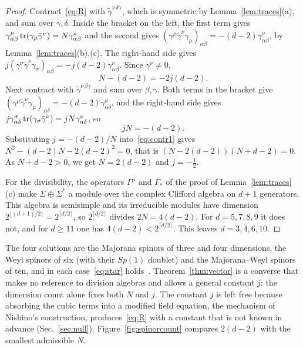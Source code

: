 \begin{proof}
Contract~\eqref{eq:R} with $\tilde\gamma^{\nu\,\delta\gamma}$, which is symmetric by Lemma~\ref{lem:traces}(a), and sum over $\gamma,\delta$. Inside the bracket on the left, the first term gives $\gamma^\mu_{\alpha\beta}\operatorname{tr}(\gamma_\mu\tilde\gamma^\nu)=N\gamma^\nu_{\alpha\beta}$ and the second gives $(\gamma^\mu\tilde\gamma^\nu\gamma_\mu)_{\alpha\beta}=-(d-2)\gamma^\nu_{\alpha\beta}$, by Lemma~\ref{lem:traces}(b),(c). The right-hand side gives $j(\gamma^\sigma\tilde\gamma^\nu\gamma_\sigma)_{\alpha\beta}=-j(d-2)\gamma^\nu_{\alpha\beta}$. Since $\gamma^\nu\ne0$,
\begin{equation}
\label{eq:contr1}
N-(d-2)=-2j(d-2).
\end{equation}
Next contract with $\tilde\gamma^{\nu\,\beta\gamma}$ and sum over $\beta,\gamma$. Both terms in the bracket give $(\gamma^\mu\tilde\gamma^\nu\gamma_\mu)_{\alpha\delta}=-(d-2)\gamma^\nu_{\alpha\delta}$, and the right-hand side gives $j\gamma^\sigma_{\alpha\delta}\operatorname{tr}(\gamma_\sigma\tilde\gamma^\nu)=jN\gamma^\nu_{\alpha\delta}$, so
\begin{equation}
\label{eq:contr2}
jN=-(d-2).
\end{equation}
Substituting $j=-(d-2)/N$ into~\eqref{eq:contr1} gives $N^2-(d-2)N-2(d-2)^2=0$, that is $(N-2(d-2))(N+d-2)=0$. As $N+d-2>0$, we get $N=2(d-2)$ and $j=-\frac12$.

For the divisibility, the operators $\Gamma^\mu$ and $\Gamma_*$ of the proof of Lemma~\ref{lem:traces}(c) make $\Sigma\oplus\Sigma^*$ a module over the complex Clifford algebra on $d+1$ generators. This algebra is semisimple and its irreducible modules have dimension $2^{\lfloor(d+1)/2\rfloor}=2^{\lceil d/2\rceil}$, so $2^{\lceil d/2\rceil}$ divides $2N=4(d-2)$. For $d=5,7,8,9$ it does not, and for $d\ge11$ one has $4(d-2)<2^{\lceil d/2\rceil}$. This leaves $d=3,4,6,10$.
\end{proof}

\begin{remark}
\label{rem:division}
The four solutions are the Majorana spinors of three and four dimensions, the Weyl spinors of six (with their $Sp(1)$ doublet) and the Majorana--Weyl spinors of ten, and in each case~\eqref{eq:star} holds~\cite{KugoTownsend1983,Evans1988,BaezHuerta2010}. Theorem~\ref{thm:vector} is a converse that makes no reference to division algebras and allows a general constant $j$: the dimension count alone fixes both $N$ and $j$. The constant $j$ is left free because absorbing the cubic terms into a modified field equation, the mechanism of Nishino's construction, produces~\eqref{eq:R} with a constant that is not known in advance (Sec.~\ref{sec:null}). Figure~\ref{fig:spinorcount} compares $2(d-2)$ with the smallest admissible $N$.
\end{remark}


